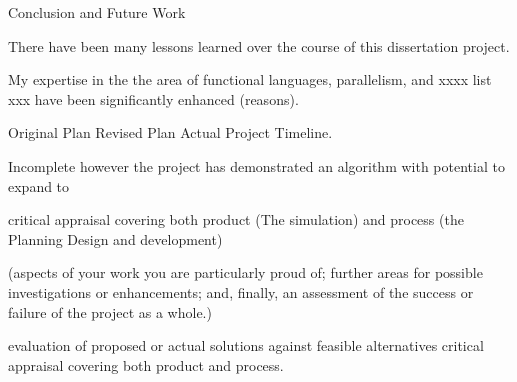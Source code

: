 \documentclass[main.tex]{subfiles}
\begin{document}

Conclusion and Future Work

There have been many lessons learned over the course of this dissertation project.


My expertise in the the area of functional languages, parallelism, and xxxx list xxx have been significantly enhanced (reasons).

Original Plan
Revised Plan
Actual Project Timeline.

Incomplete however the project has demonstrated an algorithm with potential to expand to

critical appraisal covering both product (The simulation) and process (the Planning Design and development)


(aspects of your work you are particularly proud of;
further areas for possible investigations or enhancements;
and, finally, an assessment of the success or failure of the project as a whole.)

evaluation of proposed or actual solutions against feasible alternatives
critical appraisal covering both product and process.
\end{document}
